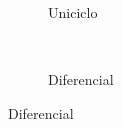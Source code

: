 
\begin{figure}[h]
\centering
\label{fig:modelo}
	 \begin{subfigure}[t]{0.5\textwidth}%
		\centering
		\robounicicloinercial
		\label{fig:uniciclo}%
		\caption{Uniciclo}%
		\end{subfigure}%
    	~
    \begin{subfigure}[t]{0.5\textwidth}%
		\centering
		\robodiffinercial
		\label{fig:diff}%
		\caption{Diferencial}%
		\end{subfigure}%
\end{figure}

